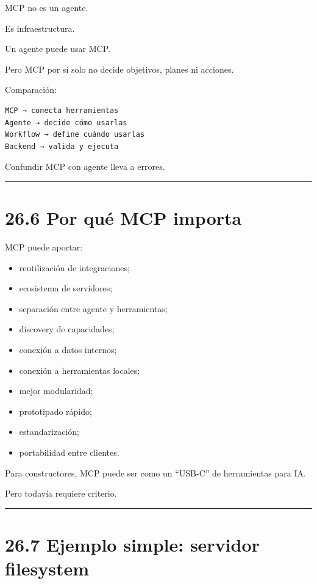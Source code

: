 MCP no es un agente.

Es infraestructura.

Un agente puede usar MCP.

Pero MCP por sí solo no decide objetivos, planes ni acciones.

Comparación:

\begin{lstlisting}
MCP → conecta herramientas
Agente → decide cómo usarlas
Workflow → define cuándo usarlas
Backend → valida y ejecuta
\end{lstlisting}

Confundir MCP con agente lleva a errores.

\begin{center}\rule{0.5\linewidth}{0.5pt}\end{center}

\section{26.6 Por qué MCP importa}\label{por-quuxe9-mcp-importa}

MCP puede aportar:

\begin{itemize}
\tightlist
\item
  reutilización de integraciones;
\item
  ecosistema de servidores;
\item
  separación entre agente y herramientas;
\item
  discovery de capacidades;
\item
  conexión a datos internos;
\item
  conexión a herramientas locales;
\item
  mejor modularidad;
\item
  prototipado rápido;
\item
  estandarización;
\item
  portabilidad entre clientes.
\end{itemize}

Para constructores, MCP puede ser como un ``USB-C'' de herramientas para
IA.

Pero todavía requiere criterio.

\begin{center}\rule{0.5\linewidth}{0.5pt}\end{center}

\section{26.7 Ejemplo simple: servidor
filesystem}\label{ejemplo-simple-servidor-filesystem}

